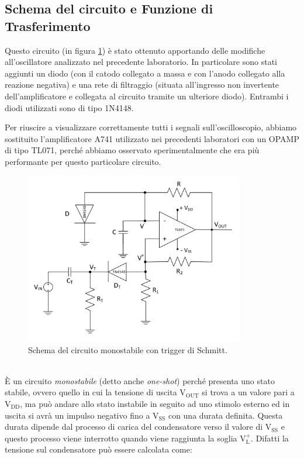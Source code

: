 \documentclass{report}
\begin{document}
\subsection{Schema del circuito e Funzione di Trasferimento}
Questo circuito (in figura \ref{figura:schema1}) è stato ottenuto apportando delle modifiche all'oscillatore analizzato nel precedente laboratorio. In particolare sono stati aggiunti un diodo (con il catodo collegato a massa e con l'anodo collegato alla reazione negativa) e una rete di filtraggio (situata all'ingresso non invertente dell'amplificatore e collegata al circuito tramite un ulteriore diodo). Entrambi i diodi utilizzati sono di tipo 1N4148.\par
Per riuscire a visualizzare correttamente tutti i segnali sull'oscilloscopio, abbiamo sostituito l'amplificatore \textmu A741 utilizzato nei precedenti laboratori con un OPAMP di tipo TL071, perché abbiamo osservato sperimentalmente che era più performante per questo particolare circuito.
\begin{figure}[h!]
	\centering
	\includegraphics[height=7.5cm]{immagini/schema1}
	\caption{Schema del circuito monostabile con trigger di Schmitt.}
	\label{figura:schema1}
\end{figure}
\\\` E un circuito \textit{monostabile} (detto anche \textit{one-shot}) perché presenta uno stato stabile, ovvero quello in cui la tensione di uscita $\displaystyle\mathrm{V_{OUT}}$ si trova a un valore pari a $\displaystyle\mathrm{V_{DD}}$, ma può andare allo stato instabile in seguito ad uno stimolo esterno ed in uscita si avrà un impulso negativo fino a $\displaystyle\mathrm{V_{SS}}$ con una durata definita.  Questa durata dipende dal processo di carica del condensatore verso il valore di $\displaystyle\mathrm{V_{SS}}$ e questo processo viene interrotto quando viene raggiunta la soglia $\displaystyle\mathrm{V_L^+}$. Difatti la tensione sul condensatore può essere calcolata come:
\end{document}
